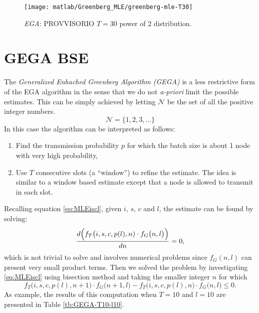 \documentclass[11pt,a4paper,twoside,openright]{book}
\newcommand{\fg}{f_{G}}
\begin{document}
\begin{figure}[H]
\begin{center}
\texttt{[image: matlab/Greenberg\_MLE/greenberg-mle-T30]}
\caption{\emph{EGA}: PROVVISORIO $T=30$  power of 2 distribution.}
\end{center}
\end{figure}

\section{GEGA BSE}
The  \emph{Generalized Enhached Greenberg Algorithm (GEGA)} is a less restrictive form of the EGA algorithm in the sense that we do not \emph{a-priori} limit the possible estimates. This can be simply achieved by letting $\mathcal{N}$ be the set of all the positive integer numbers.
\begin{equation*}
\mathcal{N}=\{1,2,3,...\}
\end{equation*}
In this case the algorithm can be interpreted as follows:
\begin{enumerate}
\item Find the transmission probability $p$ for which the batch size is about 1 node with very high probability,
\item Use $T$ consecutive slots (a ``window'') to refine the estimate. The idea is similar to a window based estimate except that a node is allowed to transmit in each slot.
\end{enumerate}

\noindent Recalling equation \eqref{eq:MLEiscl}, given $i$, $s$, $c$ and $l$, the estimate can be found by solving:
\begin{equation}
\frac{d\Bigl( f_{T}\bigl(i,s,c,p(l),n)\cdot \fg\bigl(n,l\bigr)\Bigr)}{dn}=0,
\end{equation}
which is not trivial to solve and involves numerical problems since $\fg(n,l)$ can present very small product terms. Then we solved the problem by investigating \eqref{eq:MLEiscl} using bisection method and taking the smaller integer $n$ for which
\begin{equation}
f_{T}\bigl(i,s,c,p(l),n+1)\cdot \fg\bigl(n+1,l\bigr)-f_{T}\bigl(i,s,c,p(l),n)\cdot \fg\bigl(n,l\bigr)\leq0.
\end{equation}
As example, the results of this computation when $T=10$ and $l=10$ are presented in Table \ref{tb:GEGA-T10-l10}.
\end{document}
